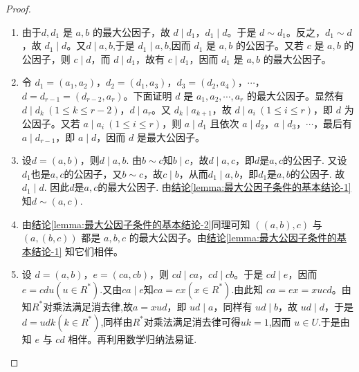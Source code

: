 \documentclass[../../main.tex]{subfiles}%
\begin{document}
\begin{proof}
\begin{enumerate}[(1)]
\item 由于\( d, d_1 \) 是 \( a, b \) 的最大公因子，故 \( d \mid d_1 \)，\( d_1 \mid d \)。于是 \( d \sim d_1 \)。反之，\( d_1 \sim d \)，故 \( d_1 \mid d \)。又$d\mid a,b$,于是 \( d_1 \mid a,b \),因而 \( d_1 \) 是 \( a, b \) 的公因子。又若 \( c \) 是 \( a,b \) 的公因子，则 \( c \mid d \)，而 \( d \mid d_1 \)，故有 \( c \mid d_1 \)，因而 \( d_1 \) 是 \( a, b\) 的最大公因子。

\item 令 \( d_1 = (a_1, a_2) \)，\( d_2 = (d_1, a_3) \)，\( d_3 = (d_2, a_4) \)，\( \cdots \)，\( d = d_{r-1} = (d_{r-2}, a_r) \)。下面证明 \( d \) 是 \( a_1, a_2, \cdots, a_r \) 的最大公因子。显然有 \( d \mid d_k \ (1 \leqslant k \leqslant r-2) \)，\( d \mid a_r \)。又 \( d_k \mid a_{k+1} \)，故 \( d \mid a_i \ (1 \leqslant i \leqslant r) \)，即 \( d \) 为公因子。又若 \( a \mid a_i \ (1 \leqslant i \leqslant r) \)，则 \( a \mid d_1 \) 且依次 \( a \mid d_2 \)，\( a \mid d_3 \)，\( \cdots \)，最后有 \( a \mid d_{r-1} \)，即 \( a \mid d \)，因而 \( d \) 是最大公因子。

\item 设$d = (a, b)$，则$d \mid a, b$. 由$b \sim c$知$b \mid c$，故$d \mid a, c$，即$d$是$a, c$的公因子. 又设$d_1$也是$a, c$的公因子，又$b \sim c$，故$c \mid b$，从而$d_1 \mid a, b$，即$d_1$是$a, b$的公因子. 故$d_1 \mid d$. 因此$d$是$a, c$的最大公因子. 由\hyperref[lemma:最大公因子条件的基本结论-1]{结论\ref{lemma:最大公因子条件的基本结论-1}}知$d \sim (a, c)$.

\item 由\hyperref[lemma:最大公因子条件的基本结论-2]{结论\ref{lemma:最大公因子条件的基本结论-2}}同理可知 \( ((a, b), c) \) 与 \( (a, (b, c)) \) 都是 \( a, b, c \) 的最大公因子。由\hyperref[lemma:最大公因子条件的基本结论-1]{结论\ref{lemma:最大公因子条件的基本结论-1}} 知它们相伴。
\item 设 \( d = (a, b) \)，\( e = (ca, cb) \)，则 \( cd \mid ca \)，\( cd \mid cb \)。于是 \( cd \mid e \)，因而 \( e = cdu(u\in R^*) \).又由$ca\mid e$知$ca=ex(x\in R^*)$.由此知 \( ca = ex = xucd \)。由知$R^*$对乘法满足消去律,故\( a = xud \)，即 \( ud \mid a \)，同样有 \( ud \mid b \)，故 \( ud \mid d \)，于是$d=udk(k\in R^*)$,同样由$R^*$对乘法满足消去律可得$uk=1$,因而 \( u \in U \).于是由知 \( e \) 与 \( cd \) 相伴。再利用数学归纳法易证.


\end{enumerate}
\end{proof}
\end{document}
